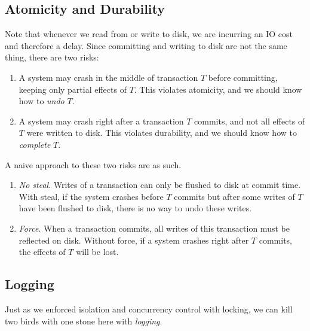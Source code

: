 \documentclass{article}
\begin{document}
  \subsection{Atomicity and Durability} 

      Note that whenever we read from or write to disk, we are incurring an IO cost and therefore a delay. Since committing and writing to disk are not the same thing, there are two risks: 
      \begin{enumerate}
        \item A system may crash in the middle of transaction $T$ before committing, keeping only partial effects of $T$. This violates atomicity, and we should know how to \textit{undo} $T$. 
        \item A system may crash right after a transaction $T$ commits, and not all effects of $T$ were written to disk. This violates durability, and we should know how to \textit{complete} $T$. 
      \end{enumerate} 

      \begin{example}
        A naive approach to these two risks are as such.  
        \begin{enumerate}
          \item \textit{No steal}. Writes of a transaction can only be flushed to disk at commit time. With steal, if the system crashes before $T$ commits but after some writes of $T$ have been flushed to disk, there is no way to undo these writes. 
          \item \textit{Force}. When a transaction commits, all writes of this transaction must be reflected on disk. Without force, if a system crashes right after $T$ commits, the effects of $T$ will be lost. 
        \end{enumerate}
      \end{example}

    \subsection{Logging} 

      Just as we enforced isolation and concurrency control with locking, we can kill two birds with one stone here with \textit{logging}. 
\end{document}
